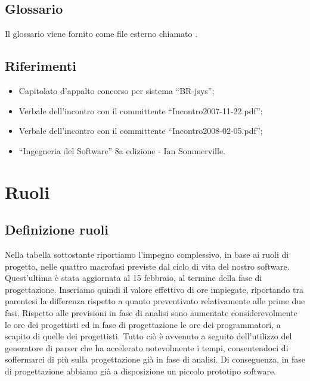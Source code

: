\documentclass[11pt,titlepage,a4paper]{report}
\begin{document}
\section{Glossario}
Il glossario viene fornito come file esterno chiamato \Glossario .

\section{Riferimenti}
\begin{itemize}
\item Capitolato d'appalto concorso per sistema ``BR-jsys'';
\item Verbale dell'incontro con il committente ``Incontro2007-11-22.pdf'';
\item Verbale dell'incontro con il committente ``Incontro2008-02-05.pdf'';
\item ``Ingegneria del Software'' 8a edizione - Ian Sommerville.
\end{itemize}

\chapter{Ruoli}
\section{Definizione ruoli}
Nella tabella sottostante riportiamo l'impegno complessivo, in base ai ruoli di progetto, nelle quattro macrofasi previste dal ciclo di vita del nostro software. Quest'ultima
\`e stata aggiornata al 15 febbraio, al termine della fase di progettazione. Inseriamo quindi il valore effettivo di ore impiegate, riportando tra parentesi la differenza rispetto a quanto preventivato relativamente alle prime due fasi.
Rispetto alle previsioni in fase di analisi sono aumentate considerevolmente 
le ore dei progettisti ed in fase di progettazione le ore 
dei programmatori, a scapito di quelle dei progettisti. 
Tutto ci\`o \`e avvenuto a seguito dell'utilizzo del generatore di parser che ha accelerato notevolmente i tempi, consentendoci di soffermarci di pi\`u sulla progettazione gi\`a in fase di analisi. Di conseguenza, in fase di progettazione abbiamo gi\`a a disposizione un piccolo prototipo software. 
\end{document}
